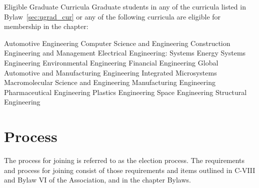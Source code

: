 \begin{enumsubsection}
\begin{enumsubsubsection}
 \end{enumsubsubsection}
\let\labelenumii\oldenumi
\item{Eligible Graduate Curricula} Graduate students in any of the curricula listed in Bylaw~\ref{sec:ugrad_cur} or any of the following curricula are eligible for membership in the chapter:
\let\oldenumi\labelenumii
\renewcommand{\labelenumii}{\arabic{enumii}.}
\begin{enumsubsubsection}
\itemnotoc Automotive Engineering
\itemnotoc Computer Science and Engineering
\itemnotoc Construction Engineering and Management
\itemnotoc Electrical Engineering: Systems
\itemnotoc Energy Systems Engineering
\itemnotoc Environmental Engineering
\itemnotoc Financial Engineering
\itemnotoc Global Automotive and Manufacturing Engineering
\itemnotoc Integrated Microsystems
\itemnotoc Macromolecular Science and Engineering
\itemnotoc Manufacturing Engineering
\itemnotoc Pharmaceutical Engineering
\itemnotoc Plastics Engineering
\itemnotoc Space Engineering
\itemnotoc Structural Engineering
\end{enumsubsubsection}
\let\labelenumii\oldenumi
\end{enumsubsection}

\section{Process} The process for joining is referred to as the election process. The requirements and process for joining consist of those requirements and items outlined in C-VIII and Bylaw VI of the Association, and in the chapter Bylaws.